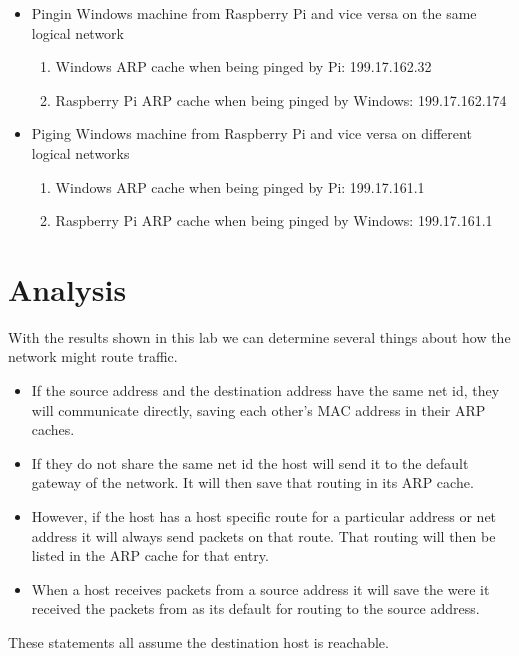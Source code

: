 \documentclass[prb,preprint]{revtex4-1}
\begin{document}
\begin{itemize}
	\item Pingin Windows machine from Raspberry Pi and vice versa on the same logical network
	\begin{enumerate}
		\item     Windows ARP cache when being pinged by Pi: 199.17.162.32 
		\item     Raspberry Pi ARP cache when being pinged by Windows: 199.17.162.174 
	\end{enumerate}
	
	\item Piging Windows machine from Raspberry Pi and vice versa on different logical networks
	\begin{enumerate}
		\item     Windows ARP cache when being pinged by Pi: 199.17.161.1 
		\item     Raspberry Pi ARP cache when being pinged by Windows: 199.17.161.1 
	\end{enumerate}
\end{itemize}

\section{Analysis}
With the results shown in this lab we can determine several things about how the network might route traffic.
\begin{itemize}
	\item     If the source address and the destination address have the same net id, they will communicate directly, saving each other’s MAC address in their ARP caches. 
	\item     If they do not share the same net id the host will send it to the default gateway of the network. It will then save that routing in its ARP cache. 
	\item     However, if the host has a host specific route for a particular address or net address it will always send packets on that route. That routing will then be listed in the ARP cache for that entry. 
	\item     When a host receives packets from a source address it will save the were it received the packets from as its default for routing to the source address. 
\end{itemize}
These statements all assume the destination host is reachable.
\end{document}
